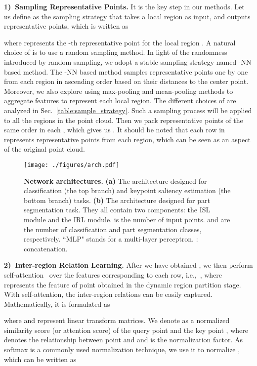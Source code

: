 \documentclass[journal]{IEEEtran}
\begin{document}
\textbf{1)~Sampling Representative Points.} It is the key step in our methods. Let us define  as the sampling strategy that takes a local region  as input, and outputs  representative points, which is written as

 where  represents the -th representative point for the local region . A natural choice of  is to use a random sampling method. In light of the randomness introduced by random sampling, we adopt a stable sampling strategy named -NN based method. The -NN based method samples  representative points one by one from each region in ascending order based on their distances to the center point.
Moreover, we also explore using max-pooling and mean-pooling methods to aggregate features to represent each local region. 
The different choices of  are analyzed in Sec.~\ref{table:sample_strategy}. Such a sampling process will be applied to all the regions in the point cloud. Then we pack representative points of the same order in each , which gives us . It should be noted that each row in  represents representative points from each region, which can be seen as an aspect of the original point cloud. 

\begin{figure*}[t]
\begin{center}
  \texttt{[image: ./figures/arch.pdf]}
\end{center}
\caption{\textbf{Network architectures.} \textbf{(a)} The architecture designed for classification (the top branch) and keypoint saliency estimation (the bottom branch) tasks. \textbf{(b)} The architecture designed for part segmentation task. They all contain two components: the ISL module and the IRL module.  is the number of input points.  and  are the number of classification and part segmentation classes, respectively. ``MLP" stands for a multi-layer perceptron. : concatenation. } 
\label{Fig.PR-Net}
\end{figure*}

\textbf{2)~Inter-region Relation Learning.} After we have obtained , we then perform self-attention~\cite{vaswani2017attention} over the features corresponding to each row, i.e.,~, where  represents the feature of point  obtained in the dynamic region partition stage.
With self-attention, the inter-region relations can be easily captured. Mathematically, it is formulated as 

where  and  represent linear transform matrices.  We denote  as a normalized similarity score (or attention score) of the query point  and the key point , where  denotes the relationship between point  and  and  is the normalization factor. As softmax is a commonly used normalization technique, we use it to normalize , which can be written as
\end{document}
